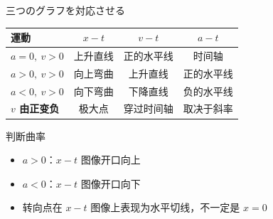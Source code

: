 \documentclass[notheorems,aspectratio=169]{beamer}
\begin{document}
\begin{frame}{三つのグラフを対応させる}
  \small
  \begin{center}
  \renewcommand{\arraystretch}{1.35}
  \begin{tabular}{>{\bfseries}lccc}
    \toprule
    運動 & $x-t$ & $v-t$ & $a-t$\\
    \midrule
    $a=0,\ v>0$ & 上升直线 & 正的水平线 & 时间轴\\
    $a>0,\ v>0$ & 向上弯曲 & 上升直线 & 正的水平线\\
    $a<0,\ v>0$ & 向下弯曲 & 下降直线 & 负的水平线\\
    $v$ 由正变负 & 极大点 & 穿过时间轴 & 取决于斜率\\
    \bottomrule
  \end{tabular}
  \end{center}
  \begin{alertblock}{判断曲率}
    \begin{itemize}
      \item $a>0$：$x-t$ 图像开口向上
      \item $a<0$：$x-t$ 图像开口向下
      \item 转向点在 $x-t$ 图像上表现为水平切线，不一定是 $x=0$
    \end{itemize}
  \end{alertblock}
\end{frame}
\end{document}
